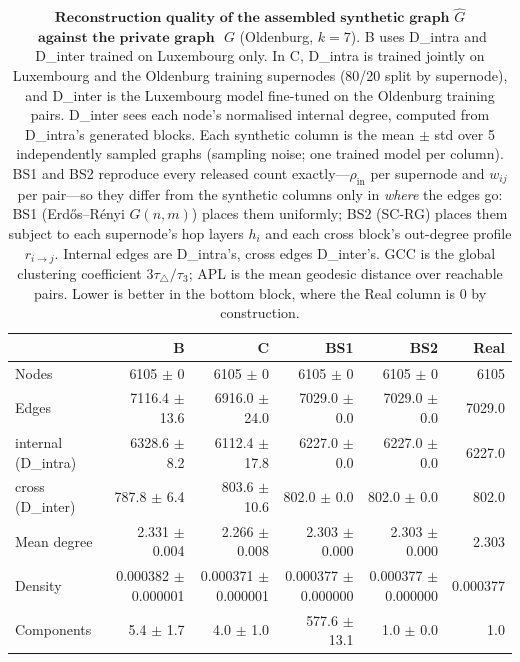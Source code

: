 \begin{table}[H]
\centering
\caption{$\textbf{Reconstruction quality of the assembled synthetic graph}$
$\widehat{G}$ $\textbf{ against the private graph }$ $G$ (Oldenburg, $k{=}7$).
B uses D\_intra and D\_inter trained on Luxembourg only. In C, D\_intra is trained jointly on Luxembourg and the Oldenburg training supernodes (80/20 split by supernode), and D\_inter is the Luxembourg model fine-tuned on the Oldenburg training pairs. D\_inter sees each node's normalised internal degree, computed from D\_intra's generated blocks. Each synthetic column is the
mean $\pm$ std over 5 independently sampled graphs (sampling noise; one trained
model per column). BS1 and BS2 reproduce every released count exactly---$\rho_{\mathrm{in}}$
per supernode and $w_{ij}$ per pair---so they differ from the synthetic columns
only in \emph{where} the edges go: BS1 (Erd\H{o}s--R\'enyi $G(n,m)$) places them
uniformly; BS2 (SC-RG) places them subject to each supernode's hop layers $h_i$ and
each cross block's out-degree profile $r_{i\to j}$. Internal edges are D\_intra's, cross edges
D\_inter's. GCC is the global clustering coefficient $3\tau_{\triangle}/\tau_{3}$;
APL is the mean geodesic distance over reachable pairs. Lower is better in the
bottom block, where the Real column is $0$ by construction.}
\label{tab:lsyn-oldenburg-k7}
\begin{tabular}{lrrrrr}
\toprule
 & B & C & BS1 & BS2 & Real \\
\midrule
Nodes                         & 6105 $\pm$ 0 & 6105 $\pm$ 0 & 6105 $\pm$ 0 & 6105 $\pm$ 0 & 6105 \\
Edges                         & 7116.4 $\pm$ 13.6 & 6916.0 $\pm$ 24.0 & 7029.0 $\pm$ 0.0 & 7029.0 $\pm$ 0.0 & 7029.0 \\
\quad internal (D\_intra)     & 6328.6 $\pm$ 8.2 & 6112.4 $\pm$ 17.8 & 6227.0 $\pm$ 0.0 & 6227.0 $\pm$ 0.0 & 6227.0 \\
\quad cross (D\_inter)        & 787.8 $\pm$ 6.4 & 803.6 $\pm$ 10.6 & 802.0 $\pm$ 0.0 & 802.0 $\pm$ 0.0 & 802.0 \\
Mean degree                   & 2.331 $\pm$ 0.004 & 2.266 $\pm$ 0.008 & 2.303 $\pm$ 0.000 & 2.303 $\pm$ 0.000 & 2.303 \\
Density                       & 0.000382 $\pm$ 0.000001 & 0.000371 $\pm$ 0.000001 & 0.000377 $\pm$ 0.000000 & 0.000377 $\pm$ 0.000000 & 0.000377 \\
Components                    & 5.4 $\pm$ 1.7 & 4.0 $\pm$ 1.0 & 577.6 $\pm$ 13.1 & 1.0 $\pm$ 0.0 & 1.0 \\

\end{tabular}
\end{table}
